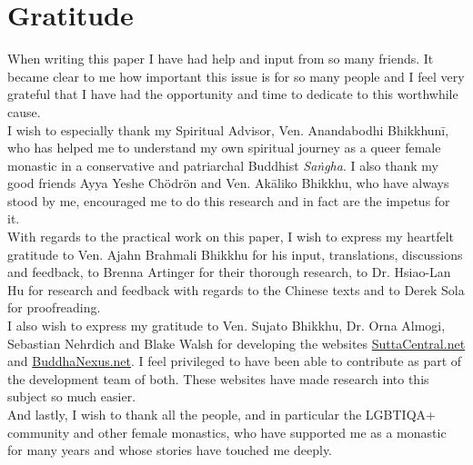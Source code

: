 \section{Gratitude}

When writing this paper I have had help and input from so many friends. It became clear to me how important this issue is for so many people and I feel very grateful that I have had the opportunity and time to dedicate to this worthwhile cause.\\

I wish to especially thank my Spiritual Advisor, Ven. Anandabodhi Bhikkhunī, who has helped me to understand my own spiritual journey as a queer female monastic in a conservative and patriarchal Buddhist \textit{Saṅgha}. I also thank my good friends Ayya Yeshe Chödrön and Ven. Akāliko Bhikkhu, who have always stood by me, encouraged me to do this research and in fact are the impetus for it.\\

With regards to the practical work on this paper, I wish to express my heartfelt gratitude to Ven. Ajahn Brahmali Bhikkhu for his input, translations, discussions and feedback, to Brenna Artinger for their thorough research, to Dr. Hsiao-Lan Hu for research and feedback with regards to the Chinese texts and to Derek Sola for proofreading.\\

I also wish to express my gratitude to Ven. Sujato Bhikkhu, Dr. Orna Almogi, Sebastian Nehrdich and Blake Walsh for developing the websites \href{https://suttacentral.net/}{SuttaCentral.net} and \href{https://buddhanexus.net/}{BuddhaNexus.net}. I feel privileged to have been able to contribute as part of the development team of both. These websites have made research into this subject so much easier.\\

And lastly, I wish to thank all the people, and in particular the LGBTIQA+ community and other female monastics, who have supported me as a monastic for many years and whose stories have touched me deeply.
